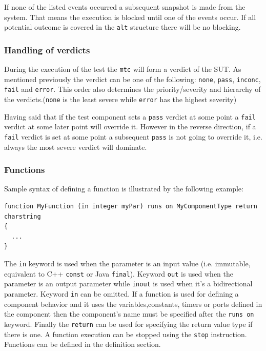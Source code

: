 \documentclass[a4paper]{article}
\begin{document}
If none of the listed events occurred a subsequent snapshot is made from the system. That means the execution is
blocked until one of the events occur. If all potential outcome is covered in the \verb!alt!
structure there will be no blocking.

\subsubsection{Handling of verdicts}

During the execution of the test the \verb!mtc! will form a verdict of the SUT. As mentioned
previously the verdict can be one of the following: \verb/none/, \verb/pass/,
\verb/inconc/, \verb/fail/ and \verb/error/. This order also determines
the priority/severity and hierarchy of the verdicts.(\verb/none/ is the least severe while
\verb/error/ has the highest severity)

Having said that if the test component sets a \verb/pass/ verdict at some point a
\verb/fail/ verdict at some later point will override it. However in the reverse direction, if a
\verb/fail/ verdict is set at some point a subsequent \verb/pass/ is not going to
override it, i.e. always the most severe verdict will dominate.

\subsubsection{Functions}

Sample syntax of defining a function is illustrated by the following example:
{\footnotesize
\begin{lstlisting}
function MyFunction (in integer myPar) runs on MyComponentType return charstring
{
  ...
}
\end{lstlisting}
}
The \verb/in/ keyword is used when the parameter is an input value (i.e. immutable, equivalent to
C++ \verb/const/ or Java \verb/final/). Keyword \verb/out/ is used
when the parameter is an output parameter while \verb/inout/ is used when it's a bidirectional
parameter. Keyword \verb/in/ can be omitted.
If a function is used for defining a component behavior and it uses the variables,constants, timers or ports defined in
the component then the component's name must be specified after the \verb/runs on/ keyword. Finally the
\verb/return/ can be used for specifying the return value type if there is one.
A function execution can be stopped using the \verb/stop/ instruction.
Functions can be defined in the definition section.
\end{document}
